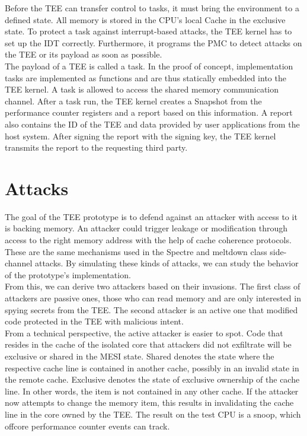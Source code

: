 Before the TEE can transfer control to tasks, it must bring the environment to a
defined state. All memory is stored in the CPU's local Cache in the exclusive
state. To protect a task against interrupt-based attacks, the TEE kernel has to
set up the IDT correctly. Furthermore, it programs the PMC to detect attacks on
the TEE or its payload as soon as possible. \\

The payload of a TEE is called a task. In the proof of concept, implementation
tasks are implemented as functions and are thus statically embedded into the TEE
kernel. A task is allowed to access the shared memory communication channel.
After a task run, the TEE kernel creates a Snapshot from the performance counter
registers and a report based on this information. A report also contains the ID
of the TEE and data provided by user applications from the host system. After
signing the report with the signing key, the TEE kernel transmits the report to
the requesting third party.

\section{Attacks}
\label{sec:30:attack}
The goal of the TEE prototype is to defend against an attacker with access to it
is backing memory. An attacker could trigger leakage or modification through
access to the right memory address with the help of cache coherence protocols.
These are the same mechanisms used in the Spectre and meltdown class
side-channel attacks. By simulating these kinds of attacks, we can study the
behavior of the prototype's implementation.\\

From this, we can derive two attackers based on their invasions. The first class
of attackers are passive ones, those who can read memory and are only interested
in spying secrets from the TEE. The second attacker is an active one that
modified code protected in the TEE with malicious intent.\\

From a technical perspective, the active attacker is easier to spot. Code that
resides in the cache of the isolated core that attackers did not exfiltrate will
be exclusive or shared in the MESI state. Shared denotes the state where the
respective cache line is contained in another cache, possibly in an invalid
state in the remote cache. Exclusive denotes the state of exclusive ownership of
the cache line. In other words, the item is not contained in any other cache. If
the attacker now attempts to change the memory item, this results in
invalidating the cache line in the core owned by the TEE. The result on the test
CPU is a snoop, which offcore performance counter events can track.\\

